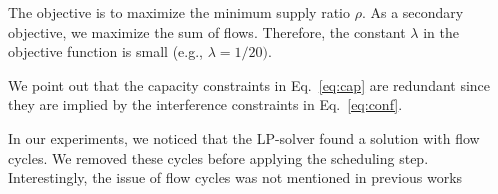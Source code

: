 \documentclass[12pt,oneside,english,a4paper]{book}
\theoremstyle{plain}
\theoremstyle{definition}
\theoremstyle{Theorem}
\theoremstyle{plain}
\newenvironment{proof sketch}[1]{\noindent {\emph{Proof sketch of #1:}}}{\hfill \qed}
\newcommand{\algA}{\textsc{MF-I-S}}
\begin{document}
The objective is to maximize the minimum supply ratio $\rho$.  As a
secondary objective, we maximize the sum of flows.
Therefore, the constant $\lambda$ in the objective function is small
(e.g., $\lambda=1/20)$.

We point out that the capacity constraints in Eq.~\ref{eq:cap} are
redundant since they are implied by the interference constraints in
Eq.~\ref{eq:conf}.

In our experiments, we noticed that the LP-solver found a solution
with flow cycles. We removed these cycles before applying the
scheduling step.  Interestingly, the issue of flow cycles was not
mentioned in previous
works~\cite{alicherry2005joint11,buragohain2007improved}

\end{document}
